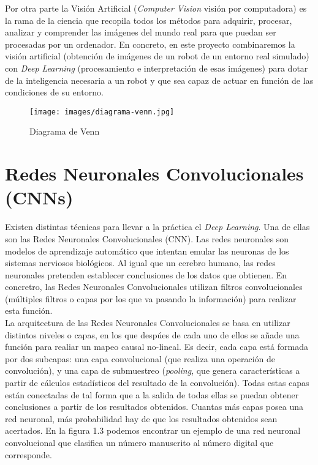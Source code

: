 \documentclass{report}
\begin{document}
\newpage
Por otra parte la Visión Artificial (\textit{Computer Vision} visión por computadora) es la rama de la ciencia que recopila todos los métodos para adquirir, procesar, analizar y comprender las imágenes del mundo real para que puedan ser procesadas por un ordenador. En concreto, en este proyecto combinaremos la visión artificial (obtención de imágenes de un robot de un entorno real simulado) con \textit{Deep Learning} (procesamiento e interpretación de esas imágenes) para dotar de la inteligencia necesaria a un robot y que sea capaz de actuar en función de las condiciones de su entorno. 

\begin{figure}[h]
	\centering
	 \texttt{[image: images/diagrama-venn.jpg]}
	 \caption{Diagrama de Venn}
\end{figure}

\newpage
\section{Redes Neuronales Convolucionales (CNNs)}

Existen distintas técnicas para llevar a la práctica el \textit{Deep Learning}. Una de ellas son las Redes Neuronales Convolucionales (CNN). Las redes neuronales son modelos de aprendizaje automático que intentan emular las neuronas de los sistemas nerviosos biológicos. Al igual que un cerebro humano, las redes neuronales pretenden establecer conclusiones de los datos que obtienen. En concretro, las Redes Neuronales Convolucionales utilizan filtros convolucionales (múltiples filtros o capas por los que va pasando la información) para realizar esta función.
\\

La arquitectura de las Redes Neuronales Convolucionales se basa en utilizar distintos niveles o capas, en los que despúes de cada uno de ellos se añade una función para realiar un mapeo causal no-lineal. Es decir, cada capa está formada por dos subcapas: una capa convolucional (que realiza una operación de convolución), y una capa de submuestreo (\textit{pooling}, que genera características a partir de cálculos estadísticos del resultado de la convolución). Todas estas capas están conectadas de  tal forma que a la salida de todas ellas se puedan obtener conclusiones a partir de los resultados obtenidos. Cuantas más capas posea una red neuronal, más probabilidad hay de que los resultados obtenidos sean acertados. En la figura 1.3 podemos encontrar un ejemplo de una red neuronal convolucional que clasifica un número manuscrito al número digital que corresponde. 
\end{document}

